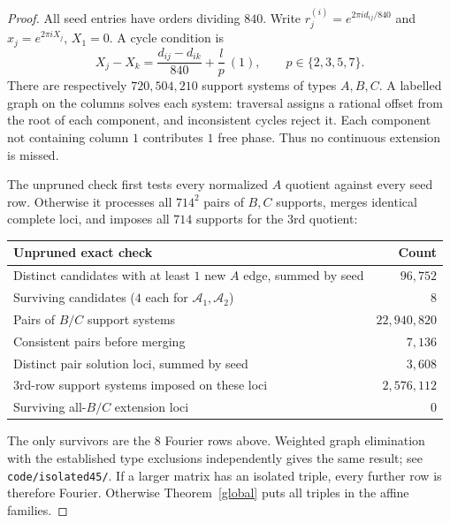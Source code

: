 \documentclass[11pt,a4paper]{article}
\theoremstyle{plain}
\theoremstyle{definition}
\numberwithin{equation}{section}
\begin{document}
\begin{proof}
All seed entries have orders dividing $840$. Write $r_j^{(i)}=e^{2\pi i d_{ij}/840}$ and $x_j=e^{2\pi iX_j}$, $X_1=0$. A cycle condition is
$$
X_j-X_k=\frac{d_{ij}-d_{ik}}{840}+\frac{l}{p}\ (1),
\qquad p\in\{2,3,5,7\}.
$$
There are respectively $720,504,210$ support systems of types $A,B,C$. A labelled graph on the columns solves each system: traversal assigns a rational offset from the root of each component, and inconsistent cycles reject it. Each component not containing column $1$ contributes $1$ free phase. Thus no continuous extension is missed.

The unpruned check first tests every normalized $A$ quotient against every seed row. Otherwise it processes all $714^2$ pairs of $B,C$ supports, merges identical complete loci, and imposes all $714$ supports for the $3$rd quotient:
\begin{center}\begin{tabular}{@{}lr@{}}\toprule
Unpruned exact check & Count\\\midrule
Distinct candidates with at least $1$ new $A$ edge, summed by seed&$96{,}752$\\
Surviving candidates ($4$ each for $\mathcal A_1,\mathcal A_2$)&$8$\\
Pairs of $B/C$ support systems&$22{,}940{,}820$\\
Consistent pairs before merging&$7{,}136$\\
Distinct pair solution loci, summed by seed&$3{,}608$\\
$3$rd-row support systems imposed on these loci&$2{,}576{,}112$\\
Surviving all-$B/C$ extension loci&$0$\\\bottomrule
\end{tabular}\end{center}
The only survivors are the $8$ Fourier rows above. Weighted graph elimination with the established type exclusions independently gives the same result; see \texttt{code/isolated45/}. If a larger matrix has an isolated triple, every further row is therefore Fourier. Otherwise Theorem~\ref{global} puts all triples in the affine families.
\end{proof}
\end{document}

